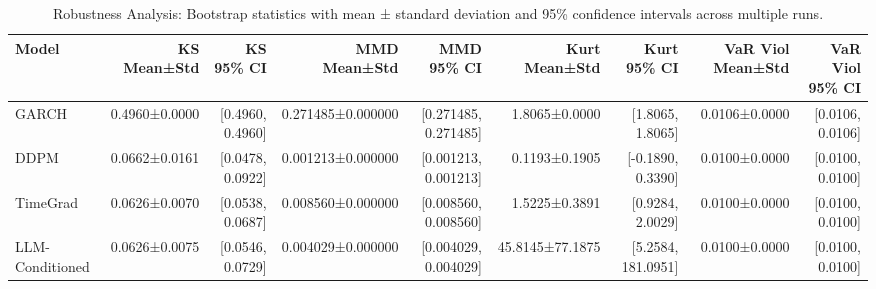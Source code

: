 \begin{table}[htbp]
\centering
\begin{tabular}{lrrrrrrrr}
\toprule
Model & KS Mean±Std & KS 95\% CI & MMD Mean±Std & MMD 95\% CI & Kurt Mean±Std & Kurt 95\% CI & VaR Viol Mean±Std & VaR Viol 95\% CI \\
\midrule
GARCH & 0.4960±0.0000 & [0.4960, 0.4960] & 0.271485±0.000000 & [0.271485, 0.271485] & 1.8065±0.0000 & [1.8065, 1.8065] & 0.0106±0.0000 & [0.0106, 0.0106] \\
DDPM & 0.0662±0.0161 & [0.0478, 0.0922] & 0.001213±0.000000 & [0.001213, 0.001213] & 0.1193±0.1905 & [-0.1890, 0.3390] & 0.0100±0.0000 & [0.0100, 0.0100] \\
TimeGrad & 0.0626±0.0070 & [0.0538, 0.0687] & 0.008560±0.000000 & [0.008560, 0.008560] & 1.5225±0.3891 & [0.9284, 2.0029] & 0.0100±0.0000 & [0.0100, 0.0100] \\
LLM-Conditioned & 0.0626±0.0075 & [0.0546, 0.0729] & 0.004029±0.000000 & [0.004029, 0.004029] & 45.8145±77.1875 & [5.2584, 181.0951] & 0.0100±0.0000 & [0.0100, 0.0100] \\
\bottomrule
\end{tabular}
\caption{Robustness Analysis: Bootstrap statistics with mean ± standard deviation and 95\% confidence intervals across multiple runs.}
\label{tab:robustness_bootstrap}
\end{table}